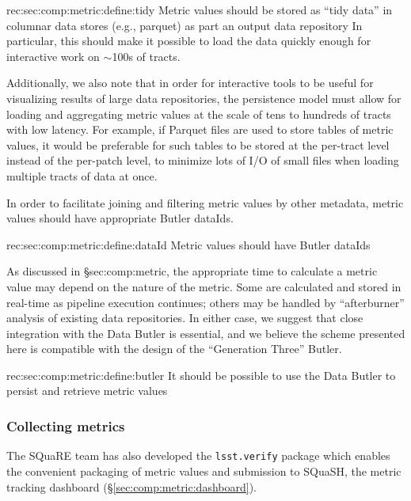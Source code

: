 \begin{recommendation}
    {rec:sec:comp:metric:define:tidy}
    {Metric values should be stored as ``tidy data'' in columnar data stores (e.g., \gls{parquet}) as part an output data repository}
In particular, this should make it possible to load the data quickly enough for interactive work on $\sim$100s of tracts.
\end{recommendation}

Additionally, we also note that in order for interactive tools to be useful for visualizing results of large data repositories, the persistence model must allow for loading and aggregating metric values at the scale of tens to hundreds of tracts with low latency.
For example, if Parquet files are used to store tables of metric values, it would be preferable for such tables to be stored at the per-tract level instead of the per-patch level, to minimize lots of I/O of small files when loading multiple tracts of data at once.

In order to facilitate joining and filtering metric values by other metadata, metric values should have appropriate Butler dataIds.

\begin{recommendation}
    {rec:sec:comp:metric:define:dataId}
    {Metric values should have Butler dataIds}
\end{recommendation}

As discussed in \S{sec:comp:metric}, the appropriate time to calculate a metric value may depend on the nature of the metric.
Some are calculated and stored in real-time as pipeline execution continues; others may be handled by ``afterburner'' analysis of existing data repositories.
In either case, we suggest that close integration with the Data Butler is essential, and we believe the scheme presented here is compatible with the design of the ``Generation Three'' Butler.

\begin{recommendation}
    {rec:sec:comp:metric:define:butler}
    {It should be possible to use the Data Butler to persist and retrieve metric values}
\end{recommendation}

\subsubsection{Collecting metrics}
\label{sec:comp:metric:collect}

The SQuaRE team has also developed the \texttt{lsst.verify} package which enables the convenient packaging of metric values and submission to SQuaSH, the metric tracking dashboard (\S\ref{sec:comp:metric:dashboard}).

